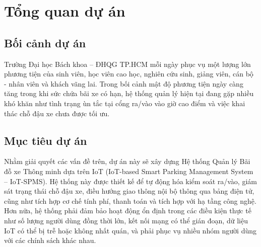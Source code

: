 \documentclass[a4paper,12pt]{article}
\begin{document}
\pagestyle{fancy}



\newpage
{}
\renewcommand{\baselinestretch}{1.25}


\newpage
{}

\tableofcontents
\newpage


\section{Tổng quan dự án}

\subsection{Bối cảnh dự án}
Trường Đại học Bách khoa – ĐHQG TP.HCM mỗi ngày phục vụ một lượng lớn phương tiện của sinh viên, học viên cao học, nghiên cứu sinh, giảng viên, cán bộ - nhân viên và khách vãng lai. Trong bối cảnh mật độ phương tiện ngày càng tăng trong khi sức chứa bãi xe có hạn, hệ thống quản lý hiện tại đang gặp nhiều khó khăn như tình trạng ùn tắc tại cổng ra/vào vào giờ cao điểm và việc khai thác chỗ đậu xe chưa được tối ưu. 


\subsection{Mục tiêu dự án}
Nhằm giải quyết các vấn đề trên, dự án này sẽ xây dựng Hệ thống Quản lý Bãi đỗ xe Thông minh dựa trên IoT (IoT-based Smart Parking Management System – IoT-SPMS). Hệ thống này được thiết kế để tự động hóa kiểm soát ra/vào, giám sát trạng thái chỗ đậu xe, điều hướng giao thông nội bộ thông qua bảng điện tử, cũng như tích hợp cơ chế tính phí, thanh toán và tích hợp với hạ tầng công nghệ. Hơn nữa, hệ thống phải đảm bảo hoạt động ổn định trong các điều kiện thực tế như số lượng người dùng đồng thời lớn, kết nối mạng có thể gián đoạn, dữ liệu IoT có thể bị trễ hoặc không nhất quán, và phải phục vụ nhiều nhóm người dùng với các chính sách khác nhau.
\end{document}
